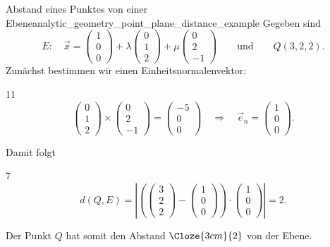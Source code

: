 \begin{ExampleBox}{Abstand eines Punktes von einer Ebene}{analytic_geometry_point_plane_distance_example}
  Gegeben sind
  \[
    E:\quad
    \vec x=\begin{pmatrix}1\\0\\0\end{pmatrix}
      +\lambda\begin{pmatrix}0\\1\\2\end{pmatrix}
      +\mu\begin{pmatrix}0\\2\\-1\end{pmatrix}
    \qquad\text{und}\qquad Q(3,2,2).
  \]
  Zunächst bestimmen wir einen Einheitsnormalenvektor:
  \begin{ClozeArea}[34]{11}
    \[
      \begin{pmatrix}0\\1\\2\end{pmatrix}
      \times
      \begin{pmatrix}0\\2\\-1\end{pmatrix}
      =\begin{pmatrix}-5\\0\\0\end{pmatrix}
      \quad\Longrightarrow\quad
      \vec e_n=\begin{pmatrix}1\\0\\0\end{pmatrix}.
    \]
  \end{ClozeArea}
  Damit folgt
  \begin{ClozeArea}[34]{7}
    \[
      d(Q,E)
      =\left\lvert
        \left(
          \begin{pmatrix}3\\2\\2\end{pmatrix}
          -\begin{pmatrix}1\\0\\0\end{pmatrix}
        \right)\cdot
        \begin{pmatrix}1\\0\\0\end{pmatrix}
      \right\rvert
      =2.
    \]
  \end{ClozeArea}
  Der Punkt $Q$ hat somit den Abstand $\Cloze{3cm}{2}$ von der Ebene.
\end{ExampleBox}
